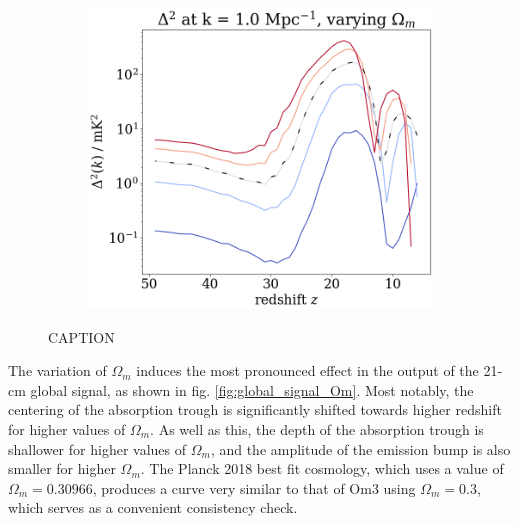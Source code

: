 \documentclass[floats,floatfix,showpacs,amssymb,prd,superscriptaddress,nofootinbib]{revtex4-2} %
\begin{document}
\begin{figure}[H]
\begin{subfigure}[b]{0.45\textwidth}
     \end{subfigure}
     \hfill
     \begin{subfigure}[b]{0.45\textwidth}
         \centering
         \includegraphics[width=\textwidth]{images/simulation_results/power_spectrum_fixed_k_1.0_Om.png}
         \label{fig:power_spectrum_fixed_k_1.0_Om}
     \end{subfigure}
        \caption{CAPTION}
        \label{fig:simulation_results_Om}
\end{figure}


The variation of $\Omega_m$ induces the most pronounced effect in the output of the 21-cm global signal, as shown in fig. \ref{fig:global_signal_Om}. Most notably, the centering of the absorption trough is significantly shifted towards higher redshift for higher values of $\Omega_m$. As well as this, the depth of the absorption trough is shallower for higher values of $\Omega_m$, and the amplitude of the emission bump is also smaller for higher $\Omega_m$. The Planck 2018 best fit cosmology, which uses a value of $\Omega_m = 0.30966$, produces a curve very similar to that of Om3 using $\Omega_m = 0.3$, which serves as a convenient consistency check. 


\end{document}
